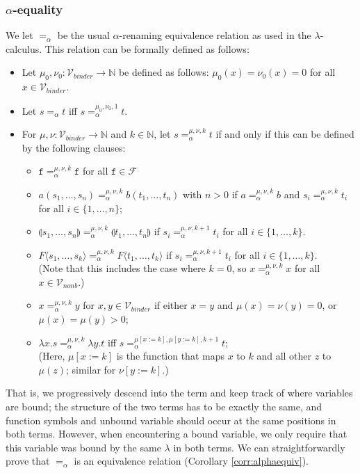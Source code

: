 \documentclass{lmcs}
\theoremstyle{theorem}\newtheorem{theorem}{Theorem}
\theoremstyle{theorem}\newtheorem{lemma}[theorem]{Lemma}
\theoremstyle{theorem}\newtheorem{corollary}[theorem]{Corollary}
\theoremstyle{definition}\newtheorem{definition}[theorem]{Definition}
\theoremstyle{definition}\newtheorem{example}[theorem]{Example}
\newcommand{\N}{\mathbb{N}}
\newcommand{\F}{\mathcal{F}}
\newcommand{\Vfree}{\mathcal{V}_{\mathit{nonb}}}
\newcommand{\Vbound}{\mathcal{V}_{\mathit{binder}}}
\newcommand{\identifier}[1]{\mathtt{#1}}
\newcommand{\afun}{\identifier{f}}
\newcommand{\avar}{x}
\newcommand{\bvar}{y}
\newcommand{\cvar}{z}
\newcommand{\ameta}{F}
\newcommand{\abs}[2]{\lambda #1.#2}
\newcommand{\meta}[2]{#1\langle#2\rangle}
\newcommand{\tuple}[2]{\llparenthesis #1,\dots,#2 \rrparenthesis}
\newcommand{\mysubsection}[1]{\vspace{-12pt}\subsubsection{#1}}
\begin{document}
\mysubsection{$\alpha$-equality}
We let $=_\alpha$ be the usual $\alpha$-renaming equivalence relation as used in
the $\lambda$-calculus. This relation can be formally defined as follows:
\begin{itemize}
\item Let $\mu_0,\nu_0 : \Vbound \rightarrow \N$ be defined as follows:
  $\mu_0(\avar) = \nu_0(\avar) = 0$ for all $\avar \in \Vbound$.
\item Let $s =_\alpha t$ iff $s =_\alpha^{\mu_0,\nu_0,1} t$.
\item For $\mu,\nu : \Vbound \rightarrow \N$ and $k \in \N$, let
  $s =_\alpha^{\mu,\nu,k} t$ if and only if this can be defined by the following
  clauses:
  \begin{itemize}
  \item $\afun =_\alpha^{\mu,\nu,k} \afun$ for all $\afun \in \F$
  \item $a(s_1,\dots,s_n) =_\alpha^{\mu,\nu,k} b(t_1,\dots,t_n)$ with $n > 0$ if
    $a =_\alpha^{\mu,\nu,k} b$ and $s_i =_\alpha^{\mu,\nu,k} t_i$ for all $i \in
    \{1,\dots,n\}$;
  \item $\tuple{s_1}{s_n} =_\alpha^{\mu,\nu,k} \tuple{t_1}{t_n}$ if
    $s_i =_\alpha^{\mu,\nu,k+1} t_i$ for all $i \in \{1,\dots,k\}$.
  \item $\meta{\ameta}{s_1,\dots,s_k} =_\alpha^{\mu,\nu,k} \meta{\ameta}{t_1,
    \dots,t_k}$ if $s_i =_\alpha^{\mu,\nu,k+1} t_i$ for all $i \in \{1,\dots,
    k\}$. \\
    (Note that this includes the case where $k = 0$, so $\avar =_\alpha^{\mu,
    \nu,k} \avar$ for all $\avar \in \Vfree$.)
  \item $\avar =_\alpha^{\mu,\nu,k} \bvar$ for $\avar,\bvar \in \Vbound$ if
    either  $\avar = \bvar$ and $\mu(\avar) = \nu(\bvar) = 0$, or $\mu(\avar) =
    \mu(\bvar) > 0$;
  \item $\abs{\avar}{s} =_\alpha^{\mu,\nu,k} \abs{\bvar}{t}$ iff $s
    =_\alpha^{\mu[\avar:=k],\mu[\bvar:=k],k+1} t$; \\
    (Here, $\mu[\avar:=k]$ is the function that maps $\avar$ to $k$ and all
    other $\cvar$ to $\mu(\cvar)$; similar for $\nu[\bvar:=k]$.)
  \end{itemize}
\end{itemize}
That is, we progressively descend into the term and keep track of where
variables are bound; the structure of the two terms has to be exactly the same,
and function symbols and unbound variable should occur at the same positions in
both terms. However, when encountering a bound variable, we only require that
this variable was bound by the same $\lambda$ in both terms.  We can
straightforwardly prove that $=_\alpha$ is an equivalence relation (Corollary
\ref{corr:alphaequiv}).
\end{document}
